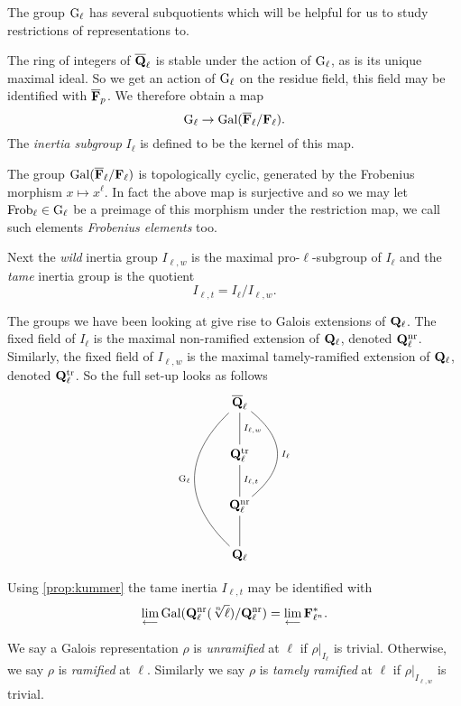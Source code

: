 \documentclass[a4paper,12pt]{article}
\begin{document}
The group $\mathrm{G}_\ell$ has several subquotients which will be helpful for us to study restrictions of representations to.
\begin{defn}\label{def:inert}
The ring of integers of $\overline{\mathbf{Q}}_\ell$ is stable under the action of $\mathrm{G}_\ell$, as is its unique maximal ideal.
So we get an action of $\mathrm{G}_\ell$ on the residue field, this field may be identified with $\overline{\mathbf{F}}_p$.
We therefore obtain a map
\[
\mathrm{G}_\ell \to \operatorname{Gal}(\overline{\mathbf{F}}_\ell/\mathbf{F}_\ell).
\]
The \emph{inertia subgroup} $I_\ell$ is defined to be the kernel of this map.

The group $\operatorname{Gal}(\overline{\mathbf{F}}_\ell/\mathbf{F}_\ell)$ is topologically cyclic, generated by the Frobenius morphism $x \mapsto x^\ell$.
In fact the above map is surjective and so we may let $\operatorname{Frob}_\ell\in \mathrm{G}_\ell$ be a preimage of this morphism under the restriction map, we call such elements \emph{Frobenius elements} too.


Next the \emph{wild} inertia group $I_{\ell,w}$ is the maximal pro-$\ell$-subgroup of $I_\ell$ and the \emph{tame} inertia group is the quotient
\[
I_{\ell,t} = I_\ell / I_{\ell,w}.
\]
\end{defn}


The groups we have been looking at give rise to Galois extensions of $\mathbf{Q}_\ell$.
The fixed field of $I_\ell$ is the maximal non-ramified extension of $\mathbf{Q}_\ell$, denoted $\mathbf{Q}_\ell^{\mathrm{nr}}$.
Similarly, the fixed field of $I_{\ell,w}$ is the maximal tamely-ramified extension of $\mathbf{Q}_\ell$, denoted $\mathbf{Q}_\ell^{\mathrm{tr}}$. %
So the full set-up looks as follows
\[
\xymatrix{
\Qlb      \ar@{-}[d]^{I_{\ell,w}} \ar@{-}@/_3pc/[ddd]_{\Gl} \ar@{-}@/^2.5pc/[dd]^{I_{\ell}}\\
\Ql^\tamr \ar@{-}[d]^{I_{\ell,t}} \\
\Ql^\nr   \ar@{-}[d] \\
\Ql
}
\]

Using \cref{prop:kummer} the tame inertia $I_{\ell,t}$ may be identified with
\[
\lim_{\longleftarrow} \Gal(\Ql^\nr(\sqrt[n]{\ell})/\Ql^\nr)= \lim_{\longleftarrow} \FF_{\ell^n}^*. %
\]

\begin{defn}
We say a Galois representation $\rho$ is \emph{unramified} at $\ell$ if $\rho|_{I_\ell}$ is trivial.
Otherwise, we say $\rho$ is \emph{ramified} at $\ell$.
Similarly we say $\rho$ is \emph{tamely ramified} at $\ell$ if $\rho|_{I_{\ell,w}}$ is trivial.
\end{defn}
\end{document}
